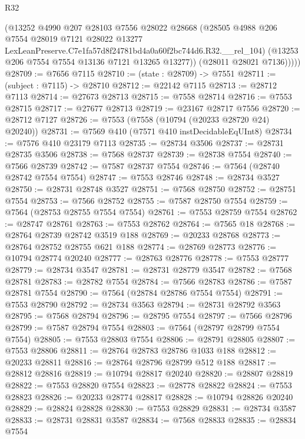 \begin{lexlean}{R32}
\begin{coremodule}
            (@13252
              @4990
              @207
              @28103
              @7556
              @28022
              @28668
              (@28505
                @4988
                @206
                @7554
                @28019
                @7121
                @28022
                @13277
                LexLeanPreserve.C7e1fa57d8f24781bd4a0a60f2bc744d6.R32.__rel_104)
              (@13253 @206 @7554 @7554 @13136 @7121 @13265 @13277))
            (@28011 @28021 @7136)))))
@28709 := @7656 @7115
@28710 := (state : @28709) -> @7551
@28711 := (subject : @7115) -> @28710
@28712 := @22142 @7115
@28713 := @28712 @7113
@28714 := @27673 @28713
@28715 := @7558 @28714
@28716 := @7553 @28715
@28717 := @27677 @28713
@28719 := @23167 @28717 @7556
@28720 := @28712 @7127
@28726 := @7553 (@7558 (@10794 (@20233 @28720 @24) @20240))
@28731 := @7569 @410 (@7571 @410 instDecidableEqUInt8)
@28734 := @7576 @410 @23179 @7113
@28735 := @28734 @3506
@28737 := @28731 @28735 @3506
@28738 := @7568 @28737
@28739 := @28738 @7554
@28740 := @7566 @28739
@28742 := @7587 @28737 @7554
@28746 := @7564 (@28740 @28742 @7554 @7554)
@28747 := @7553 @28746
@28748 := @28734 @3527
@28750 := @28731 @28748 @3527
@28751 := @7568 @28750
@28752 := @28751 @7554
@28753 := @7566 @28752
@28755 := @7587 @28750 @7554
@28759 := @7564 (@28753 @28755 @7554 @7554)
@28761 := @7553 @28759 @7554
@28762 := @28747 @28761
@28763 := @7553 @28762
@28764 := @7565 @18
@28768 := @28764 @28739 @28742 @3519 @188
@28769 := @20233 @28768
@28773 := @28764 @28752 @28755 @621 @188
@28774 := @28769 @28773
@28776 := @10794 @28774 @20240
@28777 := @28763 @28776
@28778 := @7553 @28777
@28779 := @28734 @3547
@28781 := @28731 @28779 @3547
@28782 := @7568 @28781
@28783 := @28782 @7554
@28784 := @7566 @28783
@28786 := @7587 @28781 @7554
@28790 := @7564 (@28784 @28786 @7554 @7554)
@28791 := @7553 @28790
@28792 := @28734 @3563
@28794 := @28731 @28792 @3563
@28795 := @7568 @28794
@28796 := @28795 @7554
@28797 := @7566 @28796
@28799 := @7587 @28794 @7554
@28803 := @7564 (@28797 @28799 @7554 @7554)
@28805 := @7553 @28803 @7554
@28806 := @28791 @28805
@28807 := @7553 @28806
@28811 := @28764 @28783 @28786 @1033 @188
@28812 := @20233 @28811
@28816 := @28764 @28796 @28799 @512 @188
@28817 := @28812 @28816
@28819 := @10794 @28817 @20240
@28820 := @28807 @28819
@28822 := @7553 @28820 @7554
@28823 := @28778 @28822
@28824 := @7553 @28823
@28826 := @20233 @28774 @28817
@28828 := @10794 @28826 @20240
@28829 := @28824 @28828
@28830 := @7553 @28829
@28831 := @28734 @3587
@28833 := @28731 @28831 @3587
@28834 := @7568 @28833
@28835 := @28834 @7554

\end{coremodule}
\end{lexlean}
